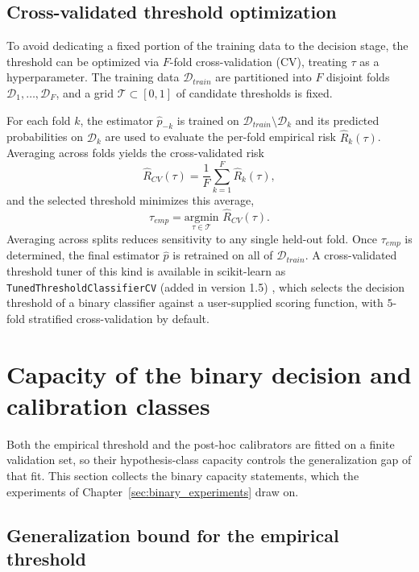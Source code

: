 \subsection{Cross-validated threshold optimization}\label{sec:cv_threshold}

To avoid dedicating a fixed portion of the training data to the decision stage, the threshold can be optimized via $F$-fold cross-validation (CV), treating $\tau$ as a hyperparameter. The training data $\mathcal{D}_{train}$ are partitioned into $F$ disjoint folds $\mathcal{D}_1, \dots, \mathcal{D}_F$, and a grid $\mathcal{T} \subset [0, 1]$ of candidate thresholds is fixed.

For each fold $k$, the estimator $\hat{p}_{-k}$ is trained on $\mathcal{D}_{train} \setminus \mathcal{D}_k$ and its predicted probabilities on $\mathcal{D}_k$ are used to evaluate the per-fold empirical risk $\hat{R}_k(\tau)$. Averaging across folds yields the cross-validated risk
\[ \hat{R}_{CV}(\tau) = \frac{1}{F} \sum_{k=1}^F \hat{R}_k(\tau), \]
and the selected threshold minimizes this average,
\[ \tau_{emp} = \underset{\tau \in \mathcal{T}}{\mathrm{argmin}} \,\, \hat{R}_{CV}(\tau). \]
Averaging across splits reduces sensitivity to any single held-out fold. Once $\tau_{emp}$ is determined, the final estimator $\hat{p}$ is retrained on all of $\mathcal{D}_{train}$. A cross-validated threshold tuner of this kind is available in scikit-learn as \texttt{TunedThresholdClassifierCV} (added in version 1.5) \citep{pedregosa2011scikit}, which selects the decision threshold of a binary classifier against a user-supplied scoring function, with $5$-fold stratified cross-validation by default.

\section{Capacity of the binary decision and calibration classes}\label{sec:binary_sample_complexity}

Both the empirical threshold and the post-hoc calibrators are fitted on a finite validation set, so their hypothesis-class capacity controls the generalization gap of that fit. This section collects the binary capacity statements, which the experiments of Chapter~\ref{sec:binary_experiments} draw on.

\subsection{Generalization bound for the empirical threshold}

